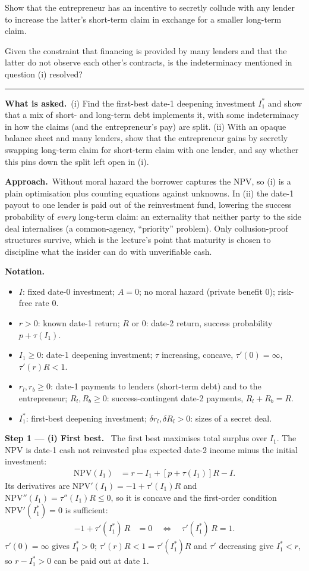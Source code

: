 \documentclass[11pt,a4paper]{article}
\newcommand{\notation}{\par\noindent\textbf{Notation.}}
\newcommand{\step}[2]{\par\medskip\noindent\textbf{Step #1 --- #2.}~}
\newcommand{\asked}{\par\medskip\noindent\textbf{What is asked.}~}
\newcommand{\approach}{\par\smallskip\noindent\textbf{Approach.}~}
\newcommand{\stmtend}{\par\endgroup\nopagebreak\noindent\rule{\linewidth}{0.4pt}\par\medskip}
\begin{document}
Show that the entrepreneur has an incentive to secretly collude with any lender to increase the
latter's short-term claim in exchange for a smaller long-term claim.

Given the constraint that financing is provided by many lenders and that the latter do not observe
each other's contracts, is the indeterminacy mentioned in question (i) resolved?
\stmtend

\asked (i) Find the first-best date-1 deepening investment $I_1^*$ and show that a mix of short- and
long-term debt implements it, with some indeterminacy in how the claims (and the entrepreneur's pay)
are split. (ii) With an opaque balance sheet and many lenders, show that the entrepreneur gains by
secretly swapping long-term claim for short-term claim with one lender, and say whether this pins down
the split left open in (i).

\approach Without moral hazard the borrower captures the NPV, so (i) is a plain optimisation plus
counting equations against unknowns. In (ii) the date-1 payout to one lender is paid out of the
reinvestment fund, lowering the success probability of \emph{every} long-term claim: an externality
that neither party to the side deal internalises (a common-agency, ``priority'' problem). Only
collusion-proof structures survive, which is the lecture's point that maturity is chosen to discipline
what the insider can do with unverifiable cash.

\notation
\begin{itemize}
  \item $I$: fixed date-0 investment; $A=0$; no moral hazard (private benefit 0); risk-free rate 0.
  \item $r>0$: known date-1 return; $R$ or 0: date-2 return, success probability $p+\tau(I_1)$.
  \item $I_1\ge 0$: date-1 deepening investment; $\tau$ increasing, concave, $\tau'(0)=\infty$, $\tau'(r)R<1$.
  \item $r_l,r_b\ge 0$: date-1 payments to lenders (short-term debt) and to the entrepreneur;
        $R_l,R_b\ge0$: success-contingent date-2 payments, $R_l+R_b=R$.
  \item $I_1^*$: first-best deepening investment; $\delta r_l,\delta R_l>0$: sizes of a secret deal.
\end{itemize}

\step{1}{(i) First best} The first best maximises total surplus over $I_1$. The NPV is date-1 cash not
reinvested plus expected date-2 income minus the initial investment:
\begin{align}
  \text{NPV}(I_1) &= r - I_1 + [p+\tau(I_1)]R - I. \label{t5e9-npv}
\end{align}
Its derivatives are $\text{NPV}'(I_1)=-1+\tau'(I_1)R$ and $\text{NPV}''(I_1)=\tau''(I_1)R\le0$, so it is
concave and the first-order condition $\text{NPV}'(I_1^*)=0$ is sufficient:
\begin{align}
  -1+\tau'(I_1^*)\,R &= 0 \quad\Longleftrightarrow\quad \tau'(I_1^*)\,R = 1. \label{t5e9-fb}
\end{align}
$\tau'(0)=\infty$ gives $I_1^*>0$; $\tau'(r)R<1=\tau'(I_1^*)R$ and $\tau'$ decreasing give $I_1^*<r$, so
$r-I_1^*>0$ can be paid out at date 1.
\end{document}
